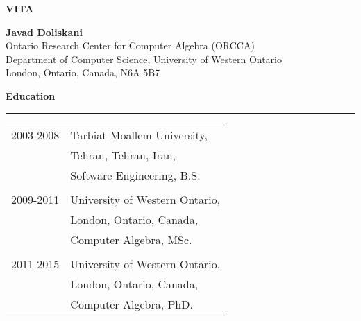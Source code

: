 \thispagestyle{empty}
\vspace*{1cm}

\begin{center}
	\textbf{VITA}
\end{center}

\begin{center}
	\textbf{Javad Doliskani}\\
	\vspace*{2mm}
	Ontario Research Center for Computer Algebra (ORCCA)\\
	Department of Computer Science, University of Western Ontario\\
	London, Ontario, Canada, N6A 5B7
\end{center}

\textbf{Education}
\vspace*{2mm}
\hrule
\vspace*{2mm}
\begin{tabular}{ll}
	2003-2008 & Tarbiat Moallem University, \\
	& Tehran, Tehran, Iran,\\
	& Software Engineering, B.S. \\
	& \\
	2009-2011 & University of Western Ontario, \\
	& London, Ontario, Canada, \\
	& Computer Algebra, MSc. \\
	& \\
	2011-2015 & University of Western Ontario, \\
	& London, Ontario, Canada, \\
	& Computer Algebra, PhD.
\end{tabular}
